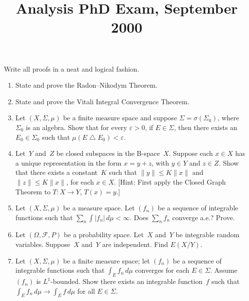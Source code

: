 \documentclass[11pt,letterpaper]{article}
\title{Analysis PhD Exam, September 2000}
\author{}
\date{}
\newenvironment{examproblems}[2]{%
  \def\ProblemHeadingTag{#2}%
  \AssignTaggingSocketPlug{block/list/label}{examproblem}%
  \begin{enumerate}%
  \setcounter{enumi}{#1}%
  \renewcommand{\labelenumi}{\textbf{\theenumi.}}%
  \setlength{\topsep}{0.35em}%
  \setlength{\partopsep}{0pt}%
  \setlength{\itemsep}{0.48em}%
  \setlength{\parsep}{0.18em}%
}{\end{enumerate}}
\newenvironment{examinstructions}{%
  \par\begingroup\itshape
}{%
  \par\endgroup\vspace{0.18em}
}
\begin{document}
\maketitle
\thispagestyle{empty}
\begin{examinstructions}
Write all proofs in a neat and logical fashion.
\end{examinstructions}
\begin{examproblems}{0}{H2}
\def\ProblemHeadingText{Problem 1.}
\item
State and prove the Radon–Nikodym Theorem.
\def\ProblemHeadingText{Problem 2.}
\item
State and prove the Vitali Integral Convergence Theorem.
\def\ProblemHeadingText{Problem 3.}
\item
Let \((X,\Sigma,\mu)\) be a finite measure space and suppose \(\Sigma=\sigma(\Sigma_0)\), where \(\Sigma_0\) is an algebra. Show that for every \(\varepsilon>0\), if \(E\in\Sigma\), then there exists an \(E_0\in\Sigma_0\) such that \(\mu(E\mathbin{\triangle}E_0)<\varepsilon\).
\def\ProblemHeadingText{Problem 4.}
\item
Let~\(Y\) and~\(Z\) be closed subspaces in the B-space~\(X\). Suppose each \(x\in X\) has a unique representation in the form \(x=y+z\), with \(y\in Y\) and \(z\in Z\). Show that there exists a constant~\(K\) such that \(\lVert y\rVert\leq K\lVert x\rVert\) and \(\lVert z\rVert\leq K\lVert x\rVert\), for each \(x\in X\). [Hint: First apply the Closed Graph Theorem to \(T:X\to Y\), \(T(x)=y\).]
\def\ProblemHeadingText{Problem 5.}
\item
Let \((X,\Sigma,\mu)\) be a measure space. Let \((f_n)\) be a sequence of integrable functions such that \(\sum_n\int |f_n|\,d\mu<\infty\). Does \(\sum_n f_n\) converge a.e.? Prove.
\def\ProblemHeadingText{Problem 6.}
\item
Let \((\Omega,\mathcal F,P)\) be a probability space. Let~\(X\) and~\(Y\) be integrable random variables. Suppose~\(X\) and~\(Y\) are independent. Find \(E(X/Y)\).
\def\ProblemHeadingText{Problem 7.}
\item
Let \((X,\Sigma,\mu)\) be a finite measure space; let \((f_n)\) be a sequence of integrable functions such that \(\int_E f_n\,d\mu\) converges for each \(E\in\Sigma\). Assume \((f_n)\) is \(L^1\)-bounded. Show there exists an integrable function~\(f\) such that \(\int_E f_n\,d\mu\to\int_E f\,d\mu\) for all \(E\in\Sigma\).
\end{examproblems}
\end{document}
